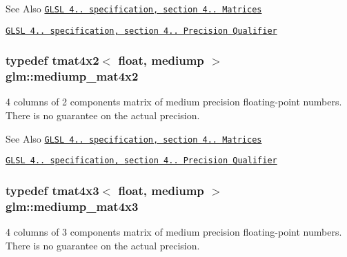 \begin{DoxySeeAlso}{See Also}
\href{http://www.opengl.org/registry/doc/GLSLangSpec.4.20.8.pdf}{\tt G\-L\-S\-L 4.. specification, section 4.. Matrices} 

\href{http://www.opengl.org/registry/doc/GLSLangSpec.4.20.8.pdf}{\tt G\-L\-S\-L 4.. specification, section 4.. Precision Qualifier} 
\end{DoxySeeAlso}
\hypertarget{group__core__precision_gaa8a2840660d106dca70acf525e8bfa6c}{
\subsubsection[{mediump\-\_\-mat4x2}]{\setlength{\rightskip}{0pt plus 5cm}typedef tmat4x2$<$ float, mediump $>$ {\bf glm\-::mediump\-\_\-mat4x2}}}\label{group__core__precision_gaa8a2840660d106dca70acf525e8bfa6c}
4 columns of 2 components matrix of medium precision floating-\/point numbers. There is no guarantee on the actual precision.

\begin{DoxySeeAlso}{See Also}
\href{http://www.opengl.org/registry/doc/GLSLangSpec.4.20.8.pdf}{\tt G\-L\-S\-L 4.. specification, section 4.. Matrices} 

\href{http://www.opengl.org/registry/doc/GLSLangSpec.4.20.8.pdf}{\tt G\-L\-S\-L 4.. specification, section 4.. Precision Qualifier} 
\end{DoxySeeAlso}
\hypertarget{group__core__precision_ga98bbda89d371b41b3d56bcbc7a4d868d}{
\subsubsection[{mediump\-\_\-mat4x3}]{\setlength{\rightskip}{0pt plus 5cm}typedef tmat4x3$<$ float, mediump $>$ {\bf glm\-::mediump\-\_\-mat4x3}}}\label{group__core__precision_ga98bbda89d371b41b3d56bcbc7a4d868d}
4 columns of 3 components matrix of medium precision floating-\/point numbers. There is no guarantee on the actual precision.

